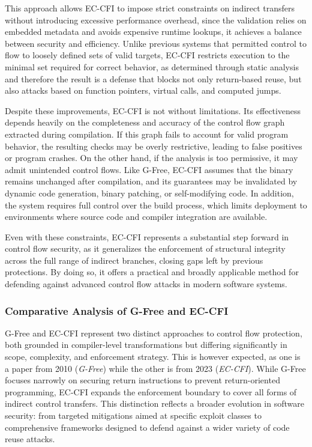 \documentclass[a4paper]{usiinfbachelorproject}
\begin{document}
This approach allows EC-CFI to impose strict constraints on indirect transfers without introducing excessive performance overhead, since the validation relies on embedded metadata and avoids expensive runtime lookups, it achieves a balance between security and efficiency. Unlike previous systems that permitted control to flow to loosely defined sets of valid targets, EC-CFI restricts execution to the minimal set required for correct behavior, as determined through static analysis and therefore the result is a defense that blocks not only return-based reuse, but also attacks based on function pointers, virtual calls, and computed jumps.

Despite these improvements, EC-CFI is not without limitations. Its effectiveness depends heavily on the completeness and accuracy of the control flow graph extracted during compilation. If this graph fails to account for valid program behavior, the resulting checks may be overly restrictive, leading to false positives or program crashes. On the other hand, if the analysis is too permissive, it may admit unintended control flows. Like G-Free, EC-CFI assumes that the binary remains unchanged after compilation, and its guarantees may be invalidated by dynamic code generation, binary patching, or self-modifying code. In addition, the system requires full control over the build process, which limits deployment to environments where source code and compiler integration are available.

Even with these constraints, EC-CFI represents a substantial step forward in control flow security, as it generalizes the enforcement of structural integrity across the full range of indirect branches, closing gaps left by previous protections. By doing so, it offers a practical and broadly applicable method for defending against advanced control flow attacks in modern software systems.



\subsubsection{Comparative Analysis of G-Free and EC-CFI}

G-Free and EC-CFI represent two distinct approaches to control flow protection, both grounded in compiler-level transformations but differing significantly in scope, complexity, and enforcement strategy. This is however expected, as one is a paper from 2010 (\textit{G-Free}) while the other is from 2023 (\textit{EC-CFI}). While G-Free focuses narrowly on securing return instructions to prevent return-oriented programming, EC-CFI expands the enforcement boundary to cover all forms of indirect control transfers. This distinction reflects a broader evolution in software security: from targeted mitigations aimed at specific exploit classes to comprehensive frameworks designed to defend against a wider variety of code reuse attacks.
\end{document}

